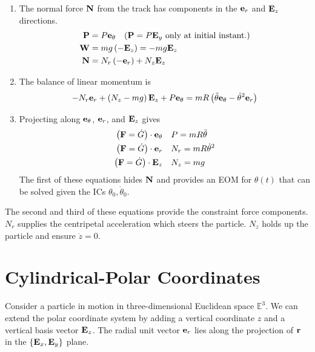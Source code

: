\documentclass[
  letterpaper,
  DIV=11,
  numbers=noendperiod]{scrreprt}
\newcommand{\lp}{\left(}
\newcommand{\rp}{\right)}
\begin{document}
\begin{enumerate}
\def\labelenumi{\arabic{enumi}.}
\setcounter{enumi}{1}
\item
  The normal force \({\bf N}\) from the track has components in the
  \({\bf e}_r\) and \({\bf E}_z\) directions. \begin{align*}
   {\bf P} &= P{\bf e}_\theta\quad ({\bf P} = P{\bf E}_y \text{ only at initial instant.})\\
   {\bf W} &= mg\lp-{\bf E}_z\rp = -mg{\bf E}_z\\
   {\bf N} &= N_r\lp-{\bf e}_r\rp+N_z{\bf E}_z
  \end{align*}
\item
  The balance of linear momentum is \begin{align*}
   -N_r{\bf e}_r+\lp N_z-mg\rp{\bf E}_z+P{\bf e}_\theta = mR\lp\ddot{\theta}{\bf e}_\theta-\dot{\theta}^2{\bf e}_r\rp
  \end{align*}
\item
  Projecting along \({\bf e}_\theta\), \({\bf e}_r\), and \({\bf E}_z\)
  gives \begin{align*}
   \lp{\bf F}=\dot{G}\rp\cdot{\bf e}_\theta &\quad P=mR\ddot{\theta}\\
   \lp{\bf F}=\dot{G}\rp\cdot{\bf e}_r &\quad N_r=mR\dot{\theta}^2\\
   \lp{\bf F}=\dot{G}\rp\cdot{\bf E}_z &\quad N_z=mg
  \end{align*} The first of these equations hides \({\bf N}\) and
  provides an EOM for \(\theta(t)\) that can be solved given the ICs
  \(\theta_0, \dot{\theta}_0\).
\end{enumerate}

The second and third of these equations provide the constraint force
components. \(N_r\) supplies the centripetal acceleration which steers
the particle. \(N_z\) holds up the particle and ensure \(\ddot{z}=0\).

\section{Cylindrical-Polar
Coordinates}\label{cylindrical-polar-coordinates}

Consider a particle in motion in three-dimensional Euclidean space
\(\mathbb{E}^3\). We can extend the polar coordinate system by adding a
vertical coordinate \(z\) and a vertical basis vector \({\bf E}_z\). The
radial unit vector \({\bf e}_r\) lies along the projection of
\({\bf r}\) in the \(\{{\bf E}_x,{\bf E}_y\}\) plane.
\end{document}
